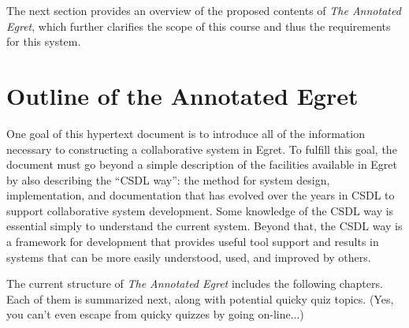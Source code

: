 The next section provides an overview of the proposed contents of {\em The 
Annotated Egret}, which further clarifies the scope of this course and
thus the requirements for this system.

\section{Outline of the Annotated Egret}
\label{sec:outline}

One goal of this hypertext document is to introduce all of the
information necessary to constructing a collaborative system in Egret.
To fulfill this goal, the document must go beyond a simple description
of the facilities available in Egret by also describing the ``CSDL
way'': the method for system design, implementation, and documentation
that has evolved over the years in CSDL to support collaborative
system development.  Some knowledge of the CSDL way is essential
simply to understand the current system.  Beyond that, the CSDL way is
a framework for development that provides useful tool support and
results in systems that can be more easily understood, used, and
improved by others.

The current structure of {\em The Annotated Egret} includes the following chapters.
Each of them is summarized next, along with potential quicky quiz topics. 
(Yes, you can't even escape from quicky quizzes by going on-line...)

